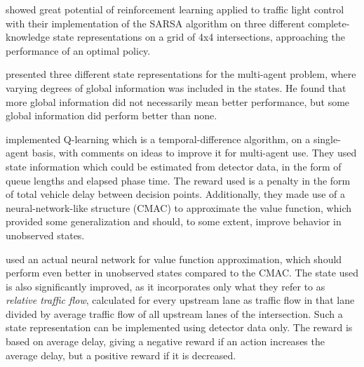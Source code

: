 \citet{Thorpe96trafficlight} showed great potential of reinforcement learning applied to traffic light control with their implementation of the SARSA algorithm on three different complete-knowledge state representations on a grid of 4x4 intersections, approaching the performance of an optimal policy.

\citet{wiering2000multi} presented three different state representations for the multi-agent problem, where varying degrees of global information was included in the states. 
He found that more global information did not necessarily mean better performance, but some global information did perform better than none.

\citet{AbdulhaiPringleKarakoulas} implemented Q-learning which is a temporal-difference algorithm, on a single-agent basis, with comments on ideas to improve it for multi-agent use. 
They used state information which could be estimated from detector data, in the form of queue lengths and elapsed phase time.  
The reward used is a penalty in the form of total vehicle delay between decision points. 
Additionally, they made use of a neural-network-like structure (CMAC) to approximate the value function, which provided some generalization and should, to some extent, improve behavior in unobserved states.

\citet{ItamarEtAl} used an actual neural network for value function approximation, which should perform even better in unobserved states compared to the CMAC. The state used is also significantly improved, as it incorporates only what they refer to as \emph{relative traffic flow}, calculated for every upstream lane as traffic flow in that lane divided by average traffic flow of all upstream lanes of the intersection. Such a state representation can be implemented using detector data only. The reward is based on average delay, giving a negative reward if an action increases the average delay, but a positive reward if it is decreased.


